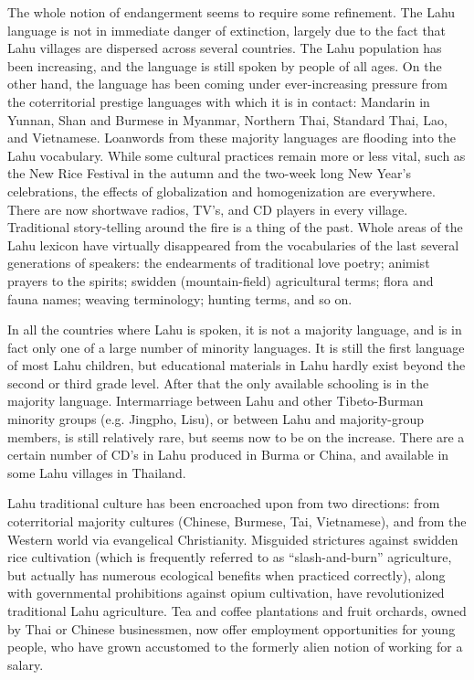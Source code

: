 \begin{itemize}
The whole notion of endangerment seems to require some refinement. The
Lahu language is not in immediate danger of extinction, largely due to
the fact that Lahu villages are dispersed across several countries. The
Lahu population has been increasing, and the language is still spoken by
people of all ages. On the other hand, the language has been coming
under ever-increasing pressure from the coterritorial prestige languages
with which it is in contact: Mandarin in Yunnan, Shan and Burmese in
Myanmar, Northern Thai, Standard Thai, Lao, and Vietnamese. Loanwords
from these majority languages are flooding into the Lahu vocabulary.
While some cultural practices remain more or less vital, such as the New
Rice Festival in the autumn and the two-week long New Year's
celebrations, the effects of globalization and homogenization are
everywhere. There are now shortwave radios, TV's, and CD players in
every village. Traditional story-telling around the fire is a thing of
the past. Whole areas of the Lahu lexicon have virtually disappeared
from the vocabularies of the last several generations of speakers: the
endearments of traditional love poetry; animist prayers to the spirits;
swidden (mountain-field) agricultural terms; flora and fauna names;
weaving terminology; hunting terms, and so on.

In all the countries where Lahu is spoken, it is not a majority
language, and is in fact only one of a large number of minority
languages. It is still the first language of most Lahu children, but
educational materials in Lahu hardly exist beyond the second or third
grade level. After that the only available schooling is in the majority
language. Intermarriage between Lahu and other Tibeto-Burman minority
groups (e.g. Jingpho, Lisu), or between Lahu and majority-group members,
is still relatively rare, but seems now to be on the increase. There are
a certain number of CD's in Lahu produced in Burma or China, and
available in some Lahu villages in Thailand.

\emph{}

Lahu traditional culture has been encroached upon from two directions:
from coterritorial majority cultures (Chinese, Burmese, Tai,
Vietnamese), and from the Western world via evangelical Christianity.
Misguided strictures against swidden rice cultivation (which is
frequently referred to as ``slash-and-burn'' agriculture, but actually
has numerous ecological benefits when practiced correctly), along with
governmental prohibitions against opium cultivation, have revolutionized
traditional Lahu agriculture. Tea and coffee plantations and fruit
orchards, owned by Thai or Chinese businessmen, now offer employment
opportunities for young people, who have grown accustomed to the
formerly alien notion of working for a salary.


\end{itemize}
